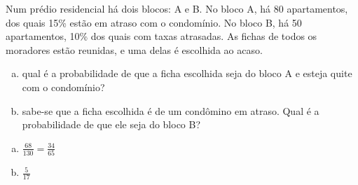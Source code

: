 \begin{ex}
 Num prédio residencial há dois blocos: A e B. No bloco A, há 80 apartamentos, dos quais 15\% estão em atraso com o condomínio. No bloco B, há 50 apartamentos, 10\% dos quais com taxas atrasadas. As fichas de todos os moradores estão reunidas, e uma delas é escolhida ao acaso.
   \begin{enumerate}[(a)]
   \item qual é a probabilidade de que a ficha escolhida seja do bloco A e esteja quite com o condomínio?
   \item sabe-se que a ficha escolhida é de um condômino em atraso. Qual é a probabilidade de que ele seja do bloco B?
   \end{enumerate}
     \begin{sol}
       \phantom{A}
       \begin{enumerate} [(a)]
           \item $\frac{68}{130}=\frac{34}{65}$
           \item
           $\frac{5}{17}$
       \end{enumerate}
     \end{sol}
\end{ex}